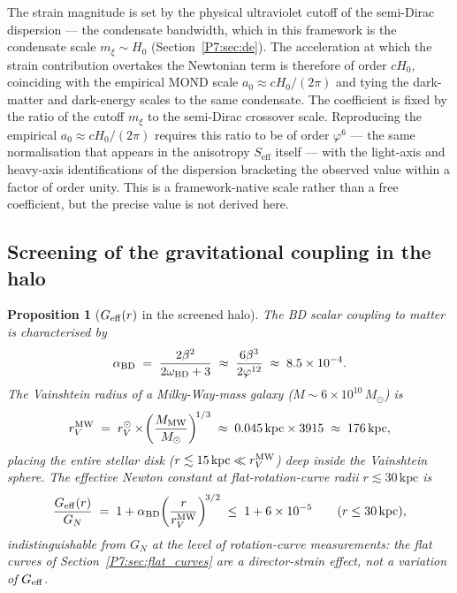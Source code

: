 \documentclass[11pt,a4paper]{article}
\newtheorem{proposition}[theorem]{Proposition}
\theoremstyle{definition}
\theoremstyle{remark}
\newcommand{\vp}{\varphi}
\begin{document}
The strain magnitude is set by the physical ultraviolet cutoff of the
semi-Dirac dispersion --- the condensate bandwidth, which in this
framework is the condensate scale $m_\xi\sim H_0$
(Section~\ref{P7:sec:de}).  The acceleration at which the strain
contribution overtakes the Newtonian term is therefore of order $cH_0$,
coinciding with the empirical MOND scale $a_0\approx cH_0/(2\pi)$ and
tying the dark-matter and dark-energy scales to the same condensate.
The coefficient is fixed by the ratio of the cutoff $m_\xi$ to the
semi-Dirac crossover scale.  Reproducing the empirical
$a_0\approx cH_0/(2\pi)$ requires this ratio to be of order $\vp^6$ ---
the same normalisation that appears in the anisotropy $S_{\mathrm{eff}}$
itself --- with the light-axis and heavy-axis identifications of the
dispersion bracketing the observed value within a factor of order unity.
This is a framework-native scale rather than a free coefficient, but the
precise value is not derived here.

\subsection{Screening of the gravitational coupling in the halo}
\label{P7:sec:halo_screening}

\begin{proposition}[$G_{\rm eff}(r)$ in the screened halo]
\label{P7:prop:Geff}
The BD scalar coupling to matter is characterised by
\begin{equation}
  \alpha_{\rm BD}
  \;=\; \frac{2\beta^2}{2\omega_{\rm BD}+3}
  \;\approx\; \frac{6\beta^3}{2\vp^{12}}
  \;\approx\; 8.5\times10^{-4}.
  \label{P7:eq:alpha_BD}
\end{equation}
The Vainshtein radius of a Milky-Way-mass galaxy
($M\sim6\times10^{10}\,M_\odot$) is
\begin{equation}
  r_V^{\rm MW}
  \;=\; r_V^\odot\times\!\left(\frac{M_{\rm MW}}{M_\odot}\right)^{\!1/3}
  \;\approx\; 0.045\,\mathrm{kpc}\times3915
  \;\approx\; 176\,\mathrm{kpc},
  \label{P7:eq:rV_MW}
\end{equation}
placing the entire stellar disk ($r\lesssim15\,\mathrm{kpc}\ll r_V^{\rm MW}$)
deep inside the Vainshtein sphere.
The effective Newton constant at flat-rotation-curve radii $r\lesssim30\,\mathrm{kpc}$
is
\begin{equation}
  \frac{G_{\rm eff}(r)}{G_N}
  \;=\; 1 + \alpha_{\rm BD}\!\left(\frac{r}{r_V^{\rm MW}}\right)^{\!3/2}
  \;\leq\; 1 + 6\times10^{-5}
  \qquad(r\leq30\,\mathrm{kpc}),
  \label{P7:eq:Geff_screened}
\end{equation}
indistinguishable from $G_N$ at the level of rotation-curve measurements:
the flat curves of Section~\ref{P7:sec:flat_curves} are a director-strain
effect, not a variation of $G_{\rm eff}$.
\end{proposition}
\end{document}
